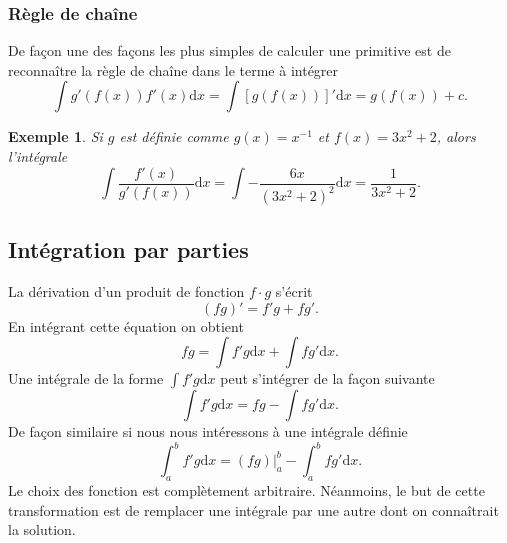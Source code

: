 \documentclass[a4paper,12pt]{book}
\newcommand{\dd}{\mathrm{d}}
\newtheorem*{exemple}{Exemple}
\begin{document}
\subsubsection{Règle de chaîne}
De façon une des façons les plus simples de calculer une primitive est de reconnaître la règle de chaîne 
dans le terme à intégrer
\begin{equation}
 \int g'(f(x))f'(x)\dd x=\int [g(f(x))]' \dd x=g(f(x))+c.
\end{equation}
\begin{exemple}
Si $g$ est définie comme $g(x)=x^{-1}$ et $f(x)=3x^2+2$, alors l'intégrale 
\begin{equation}
 \int \frac{f'(x)}{g'(f(x))}\dd x=\int -\frac{6 x}{(3x^2+2)^2}\dd x=\frac{1}{3x^2+2}.
\end{equation} 
\end{exemple}




\subsection{Intégration par parties}
La dérivation d'un produit de fonction $f\cdot g$ s'écrit
\begin{equation}
 (fg)'=f' g+f g'.
\end{equation}
En intégrant cette équation on obtient
\begin{equation}
 fg=\int f' g\dd x+\int f g'\dd x.
\end{equation}
Une intégrale de la forme $\int f' g\dd x$ peut s'intégrer de la façon suivante
\begin{equation}
 \int f' g\dd x=fg-\int f g'\dd x.
\end{equation}
De façon similaire si nous nous intéressons à une intégrale définie
\begin{equation}
 \int_a^b f' g\dd x=\left.(fg)\right|_a^b-\int_a^b f g'\dd x.
\end{equation}
Le choix des fonction est complètement arbitraire. 
Néanmoins, le but de cette transformation est de remplacer une intégrale par une autre dont on connaîtrait la solution.
\end{document}
